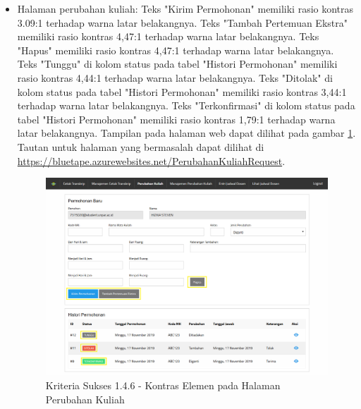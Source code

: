 \documentclass[a4paper,twoside]{article}
\begin{document}
\begin{enumerate}
\begin{itemize}
			\item Halaman perubahan kuliah: Teks "Kirim Permohonan" memiliki rasio kontras 3.09:1 terhadap warna latar belakangnya. Teks "Tambah Pertemuan Ekstra" memiliki rasio kontras 4,47:1 terhadap warna latar belakangnya. Teks "Hapus" memiliki rasio kontras 4,47:1 terhadap warna latar belakangnya. Teks "Tunggu" di kolom status pada tabel "Histori Permohonan" memiliki rasio kontras 4,44:1 terhadap warna latar belakangnya. Teks "Ditolak" di kolom status pada tabel "Histori Permohonan" memiliki rasio kontras 3,44:1 terhadap warna latar belakangnya. Teks "Terkonfirmasi" di kolom status pada tabel "Histori Permohonan" memiliki rasio kontras 1,79:1 terhadap warna latar belakangnya. Tampilan pada halaman web dapat dilihat pada gambar \ref{fig:1.4.6_contrast_enchanced_4}. Tautan untuk halaman yang bermasalah dapat dilihat di \url{https://bluetape.azurewebsites.net/PerubahanKuliahRequest}.
			\begin{figure}[H]
				\centering  
				\includegraphics[scale=0.3, frame]{kriteria-sukses-1-4-6-contrast-enchanced-4}  
				\caption[Kriteria Sukses 1.4.6 - Kontras Elemen pada Halaman Perubahan Kuliah]{Kriteria Sukses 1.4.6 - Kontras Elemen pada Halaman Perubahan Kuliah}
				\label{fig:1.4.6_contrast_enchanced_4}  
			\end{figure} 
			

\end{itemize}
\end{enumerate}
\end{document}
